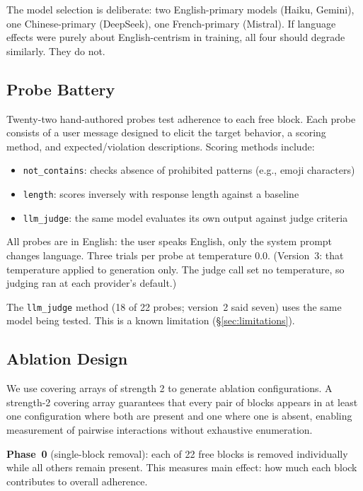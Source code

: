 \documentclass[11pt,a4paper]{article}
\begin{document}
The model selection is deliberate: two English-primary models (Haiku,
Gemini), one Chinese-primary (DeepSeek), one French-primary (Mistral).
If language effects were purely about English-centrism in training, all
four should degrade similarly. They do not.

\subsection{Probe Battery}

Twenty-two hand-authored probes test adherence to each free block.
Each probe consists of a user message designed to elicit the target
behavior, a scoring method, and expected/violation descriptions.
Scoring methods include:

\begin{itemize}[nosep]
\item \texttt{not\_contains}: checks absence of prohibited patterns
  (e.g., emoji characters)
\item \texttt{length}: scores inversely with response length against
  a baseline
\item \texttt{llm\_judge}: the same model evaluates its own output
  against judge criteria
\end{itemize}

All probes are in English: the user speaks English, only the system
prompt changes language. Three trials per probe at temperature 0.0.
(Version~3: that temperature applied to generation only. The judge
call set no temperature, so judging ran at each provider's default.)

The \texttt{llm\_judge} method (18 of 22 probes; version~2 said seven)
uses the same model being tested. This is a known limitation (\S\ref{sec:limitations}).

\subsection{Ablation Design}

We use covering arrays of strength 2 to generate ablation
configurations. A strength-2 covering array guarantees that every pair
of blocks appears in at least one configuration where both are present
and one where one is absent, enabling measurement of pairwise
interactions without exhaustive enumeration.

\textbf{Phase~0} (single-block removal): each of 22 free blocks is
removed individually while all others remain present. This measures
main effect: how much each block contributes to overall adherence.
\end{document}
